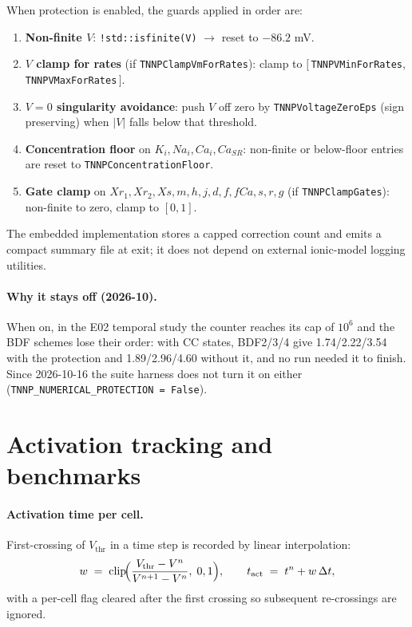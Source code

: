 \documentclass[11pt,a4paper]{article}
\newcommand{\code}[1]{\texttt{\small #1}}
\begin{document}
When protection is enabled, the guards applied in order are:
\begin{enumerate}[topsep=0pt,itemsep=2pt]
  \item \textbf{Non-finite $V$}: \code{!std::isfinite(V)} $\rightarrow$
        reset to $-86.2$ mV.
  \item \textbf{$V$ clamp for rates} (if \code{TNNPClampVmForRates}):
        clamp to $[\,$\code{TNNPVMinForRates}, \code{TNNPVMaxForRates}$\,]$.
  \item \textbf{$V=0$ singularity avoidance}: push $V$ off zero by
        \code{TNNPVoltageZeroEps} (sign preserving) when
        $\lvert V \rvert$ falls below that threshold.
  \item \textbf{Concentration floor} on $K_{i}, Na_{i}, Ca_{i}, Ca_{SR}$:
        non-finite or below-floor entries are reset to
        \code{TNNPConcentrationFloor}.
  \item \textbf{Gate clamp} on $Xr_{1}, Xr_{2}, Xs, m, h, j, d, f, fCa,
        s, r, g$ (if \code{TNNPClampGates}): non-finite to zero,
        clamp to $[0, 1]$.
\end{enumerate}

The embedded implementation stores a capped correction count and emits a
compact summary file at exit; it does not depend on external ionic-model
logging utilities.

\paragraph{Why it stays off (2026-10).} When on, in the E02 temporal study the
counter reaches its cap of $10^6$ and the BDF schemes lose their order: with CC
states, BDF2/3/4 give 1.74/2.22/3.54 with the protection and 1.89/2.96/4.60
without it, and no run needed it to finish. Since 2026-10-16 the suite harness
does not turn it on either (\code{TNNP\_NUMERICAL\_PROTECTION = False}).

\section{Activation tracking and benchmarks}

\paragraph{Activation time per cell.}
First-crossing of $V_{\text{thr}}$ in a time step is recorded by linear
interpolation:
\begin{equation}
  w \;=\; \mathrm{clip}\!\Bigl(
      \frac{V_{\text{thr}} - V^{n}}{V^{n+1} - V^{n}},
      \; 0, 1
    \Bigr),
   \qquad
   t_{\text{act}} \;=\; t^{n} + w\, \Delta t,
\end{equation}
with a per-cell flag cleared after the first crossing so subsequent
re-crossings are ignored.
\end{document}
